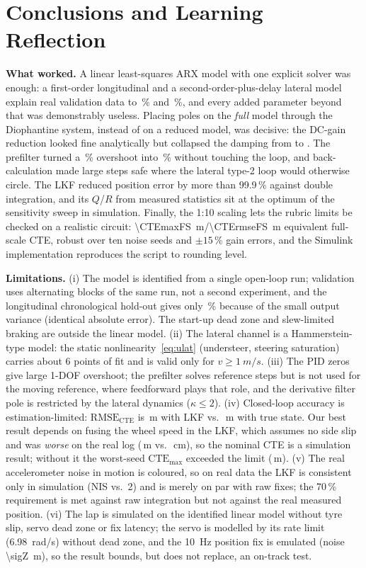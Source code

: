 \documentclass[conference]{IEEEtran}
\begin{document}
\section{Conclusions and Learning Reflection}\label{sec:conc}
\textbf{What worked.} A linear least-squares ARX model with one explicit solver was enough: a first-order longitudinal and a second-order-plus-delay lateral model explain real validation data to \fitLonVaFree\,\% and \fitLatVaFree\,\%, and every added parameter beyond that was demonstrably useless. Placing poles on the \emph{full} model through the Diophantine system, instead of on a reduced model, was decisive: the DC-gain reduction looked fine analytically but collapsed the damping from \latZetaPID{} to \latStaticZeta{}. The prefilter turned a \latOSoneDOF\,\% overshoot into \latOS\,\% without touching the loop, and back-calculation made large steps safe where the lateral type-2 loop would otherwise circle. The LKF reduced position error by more than 99.9\,\% against double integration, and its $Q$/$R$ from measured statistics sit at the optimum of the sensitivity sweep in simulation. Finally, the 1:10 scaling lets the rubric limits be checked on a realistic circuit: \SI{\CTEmaxFS}{m}/\SI{\CTErmseFS}{m} equivalent full-scale CTE, robust over ten noise seeds and $\pm15\,\%$ gain errors, and the Simulink implementation reproduces the script to rounding level.

\textbf{Limitations.} (i) The model is identified from a single open-loop run; validation uses alternating blocks of the same run, not a second experiment, and the longitudinal chronological hold-out gives only \fitLonChrono\,\% because of the small output variance (identical absolute error). The start-up dead zone and slew-limited braking are outside the linear model. (ii) The lateral channel is a Hammerstein-type model: the static nonlinearity~\eqref{eq:ulat} (understeer, steering saturation) carries about 6 points of fit and is valid only for $v\ge\SI{1}{m/s}$. (iii) The PID zeros give large 1-DOF overshoot; the prefilter solves reference steps but is not used for the moving reference, where feedforward plays that role, and the derivative filter pole is restricted by the lateral dynamics ($\kappa\le2$). (iv) Closed-loop accuracy is estimation-limited: $\mathrm{RMSE}_\mathrm{CTE}$ is \CTErmse\,m with LKF vs.\ \idealCTErmse\,m with true state. Our best result depends on fusing the wheel speed in the LKF, which assumes no side slip and was \emph{worse} on the real log (\realWheelRMSE\,m vs.\ \realRMSEcm\,cm), so the nominal CTE is a simulation result; without it the worst-seed $\mathrm{CTE}_{\max}$ exceeded the limit (\ablActe\,m). (v) The real accelerometer noise in motion is coloured, so on real data the LKF is consistent only in simulation (NIS \realNIS{} vs.\ 2) and is merely on par with raw fixes; the 70\,\% requirement is met against raw integration but not against the real measured position. (vi) The lap is simulated on the identified linear model without tyre slip, servo dead zone or fix latency; the servo is modelled by its rate limit (\SI{6.98}{rad/s}) without dead zone, and the \SI{10}{Hz} position fix is emulated (noise \SI{\sigZ}{m}), so the result bounds, but does not replace, an on-track test.
\end{document}

